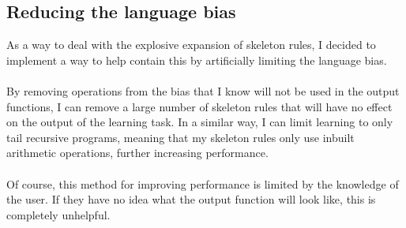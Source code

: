 \subsection{Reducing the language bias}
As a way to deal with the explosive expansion of skeleton rules, I decided to implement a way to help contain this by artificially limiting the language bias. \\ \\
By removing operations from the bias that I know will not be used in the output functions, I can remove a large number of skeleton rules that will have no effect on the output of the learning task. In a similar way, I can limit learning to only tail recursive programs, meaning that my skeleton rules only use inbuilt arithmetic operations, further increasing performance. \\ \\
Of course, this method for improving performance is limited by the knowledge of the user. If they have no idea what the output function will look like, this is completely unhelpful. 

\pagebreak
%
%